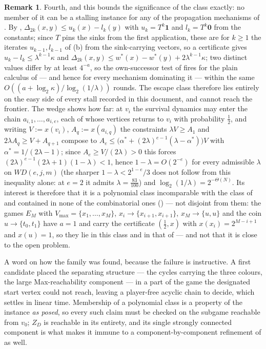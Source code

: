 \documentclass[11pt]{article}
\theoremstyle{plain}
\theoremstyle{definition}
\newtheorem{remark}[theorem]{Remark}
\newcommand{\Vmax}{V_{\max}}
\begin{document}
\begin{remark}
Fourth, and this bounds the significance of the class exactly: no member
of it can be a stalling instance for any of the propagation mechanisms of
. By ,
$\Delta_{2k}(x,y)\le u_k(x)-l_k(y)$ with $u_k=T^{k}\mathbf1$ and
$l_k=T^{k}\mathbf0$ from the constants; since $T$ pins the sinks from
the first application, these are for $k\ge1$ the iterates
$u_{k-1},l_{k-1}$ of (b) from the sink-carrying
vectors, so a certificate gives $u_k-l_k\le\lambda^{k-1}\kappa$ and
$\Delta_{2k}(x,y)\le w^\ast(x)-w^\ast(y)+2\lambda^{k-1}\kappa$; two
distinct values differ by at least $4^{-a}$, so the own-successor test of
 fires for the plain calculus of
 --- and hence for every mechanism dominating it ---
within the same $O((a+\log_2\kappa)/\log_2(1/\lambda))$ rounds. The
escape class therefore lies entirely on the easy side of every stall
recorded in this document, and cannot reach the frontier. The wedge shows
how far: at $v_i$ the survival dynamics may enter the chain
$a_{i,1},\dots,a_{i,e}$, each of whose vertices returns to $v_i$ with
probability $\tfrac12$, and writing $V:=x(v_i)$, $A_q:=x(a_{i,q})$ the
constraints $\lambda V\ge A_1$ and $2\lambda A_q\ge V+A_{q+1}$ compose
to $A_e\le\bigl(\alpha^\ast+(2\lambda)^{e-1}(\lambda-\alpha^\ast)\bigr)V$
with $\alpha^\ast=1/(2\lambda-1)$; since $A_e\ge V/(2\lambda)>0$ this
forces $(2\lambda)^{e-1}(2\lambda+1)(1-\lambda)<1$, hence
$1-\lambda=O(2^{-e})$ for every admissible $\lambda$ on $WD(e,j,m)$ (the
sharper $1-\lambda<2^{1-e}/3$ does not follow from this inequality alone:
at $e=2$ it admits $\lambda=\tfrac{83}{100}$) and
$\log_2(1/\lambda)=2^{-\Theta(N)}$. Its interest is therefore that it is a
polynomial class incomparable with the class of 
and contained in none of the combinatorial ones
() --- not disjoint from them: the games $E_M$
with $\Vmax=\{x_1,\dots,x_M\}$, $x_i\to\{x_{i+1},x_{i+1}\}$,
$x_M\to\{u,u\}$ and the coin $u\to\{t_0,t_1\}$ have $a=1$ and carry the
certificate $(\tfrac12,x)$ with $x(x_i)=2^{M-i+1}$ and $x(u)=1$, so they
lie in this class and in that of  --- and not that it
is close to the open problem.

A word on how the family was found, because the failure is instructive.
A first candidate placed the separating structure --- the cycles carrying
the three colours, the large Max-reachability component --- in a part of
the game the designated start vertex could not reach, leaving a
player-free acyclic chain to decide, which 
settles in linear time. Membership of a polynomial class is a property of
the instance \emph{as posed}, so every such claim must be checked on the
subgame reachable from $v_0$; $Z_D$ is reachable in its entirety, and its
single strongly connected component is what makes it immune to a
component-by-component refinement of  as well.
\end{remark}
\end{document}

